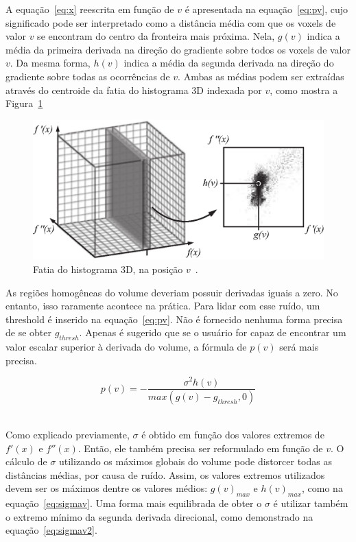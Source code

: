 	A equação~\eqref{eq:x} reescrita em função de $v$ é apresentada na equação~\eqref{eq:pv}, cujo significado pode ser interpretado como a distância média com que os voxels de valor $v$ se encontram do centro da fronteira mais próxima. Nela, $g(v)$ indica a média da primeira derivada na direção do gradiente sobre todos os voxels de valor $v$. Da mesma forma, $h(v)$ indica a média da segunda derivada na direção do gradiente sobre todas as ocorrências de $v$. Ambas as médias podem ser extraídas através do centroide da fatia do histograma 3D indexada por $ v $, como mostra a Figura~\ref{fig:g_hv}
	
\begin{figure}[h]
	\centering
	\includegraphics[width=1\textwidth]{images/g_hv}
	\caption{Fatia do histograma 3D, na posição $ v $~\cite{gordonms}.}
	\label{fig:g_hv}
\end{figure}

	As regiões homogêneas do volume deveriam possuir derivadas iguais a zero. No entanto, isso raramente acontece na prática. Para lidar com esse ruído, um threshold é inserido na equação~\eqref{eq:pv}. Não é fornecido nenhuma forma precisa de se obter $ g_{thresh} $. Apenas é sugerido que se o usuário for capaz de encontrar um valor escalar superior à derivada  do volume, a fórmula de $ p(v) $ será mais precisa.

\begin{equation} \label{eq:pv}
	p(v) = -\frac{\sigma^{2}h(v)}{max(g(v) - g_{thresh}, 0)}
\end{equation} \

	Como explicado previamente, $\sigma$ é obtido em função dos valores extremos de $f'(x)$ e $f''(x)$. Então, ele também precisa ser reformulado em função de $v$. O cálculo de $\sigma$ utilizando os máximos globais do volume pode distorcer todas as distâncias médias, por causa de ruído. Assim, os valores extremos utilizados devem ser os máximos dentre os valores médios: $g(v)_{max}$ e $h(v)_{max}$, como na equação~\eqref{eq:sigmav}. Uma forma mais equilibrada de obter o $\sigma$ é utilizar também o extremo mínimo da segunda derivada direcional, como demonstrado na equação~\eqref{eq:sigmav2}.
	

